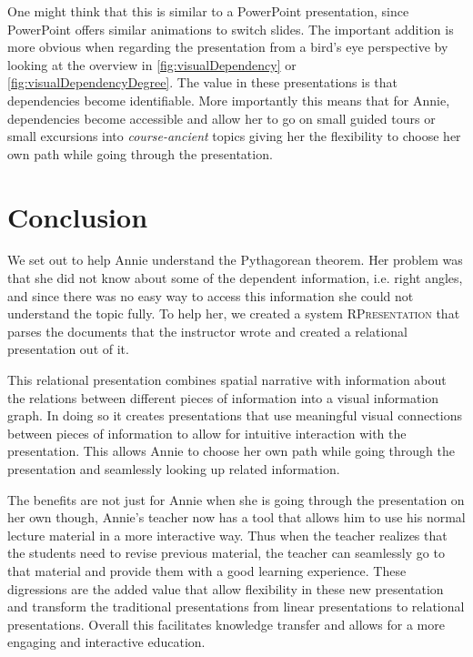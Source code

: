 \documentclass{llncs}
\newcommand{\sys}{\textsc{RPresentation}\xspace}
\begin{document}
One might think that this is similar to a PowerPoint presentation, since PowerPoint offers similar animations to switch slides. The important addition is more obvious when regarding the presentation from a bird's eye perspective by looking at the overview in \autoref{fig:visualDependency} or \autoref{fig:visualDependencyDegree}. The value in these presentations is that dependencies become identifiable. More importantly this means that for Annie, dependencies become accessible and allow her to go on small guided tours or small excursions into \textit{course-ancient} topics giving her the flexibility to choose her own path while going through the presentation.

\section{Conclusion}
\label{sec:conclusion}

We set out to help Annie understand the Pythagorean theorem. Her problem was that she did not know about some of the dependent information, i.e. right angles, and since there was no easy way to access this information she could not understand the topic fully. To help her, we created a system \sys that parses the documents that the instructor wrote and created a relational presentation out of it.

This relational presentation combines spatial narrative with information about the relations between different pieces of information into a visual information graph. In doing so it creates presentations that use meaningful visual connections between pieces of information to allow for intuitive interaction with the presentation. This allows Annie to choose her own path while going through the presentation and seamlessly looking up related information.

The benefits are not just for Annie when she is going through the presentation on her own though, Annie's teacher now has a tool that allows him to use his normal lecture material in a more interactive way. Thus when the teacher realizes that the students need to revise previous material, the teacher can seamlessly go to that material and provide them with a good learning experience. These digressions are the added value that allow flexibility in these new presentation and transform the traditional presentations from linear presentations to relational presentations. Overall this facilitates knowledge transfer and allows for a more engaging and interactive education.
\end{document}
